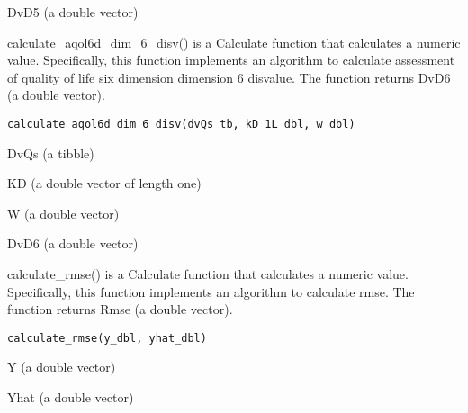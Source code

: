 \documentclass[a4paper]{book}
\begin{document}
%
\begin{Value}
DvD5 (a double vector)
\end{Value}
%
\begin{Description}\relax
calculate\_aqol6d\_dim\_6\_disv() is a Calculate function that calculates a numeric value. Specifically, this function implements an algorithm to calculate assessment of quality of life six dimension dimension 6 disvalue. The function returns DvD6 (a double vector).
\end{Description}
%
\begin{Usage}
\begin{verbatim}
calculate_aqol6d_dim_6_disv(dvQs_tb, kD_1L_dbl, w_dbl)
\end{verbatim}
\end{Usage}
%
\begin{Arguments}
\begin{ldescription}
\item[\code{dvQs\_tb}] DvQs (a tibble)

\item[\code{kD\_1L\_dbl}] KD (a double vector of length one)

\item[\code{w\_dbl}] W (a double vector)
\end{ldescription}
\end{Arguments}
%
\begin{Value}
DvD6 (a double vector)
\end{Value}
%
\begin{Description}\relax
calculate\_rmse() is a Calculate function that calculates a numeric value. Specifically, this function implements an algorithm to calculate rmse. The function returns Rmse (a double vector).
\end{Description}
%
\begin{Usage}
\begin{verbatim}
calculate_rmse(y_dbl, yhat_dbl)
\end{verbatim}
\end{Usage}
%
\begin{Arguments}
\begin{ldescription}
\item[\code{y\_dbl}] Y (a double vector)

\item[\code{yhat\_dbl}] Yhat (a double vector)
\end{ldescription}
\end{Arguments}
\end{document}
